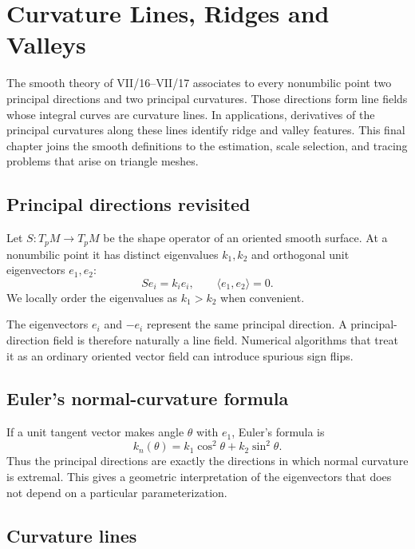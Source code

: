\chapter{Curvature Lines, Ridges and Valleys}
\label{ch:vii42}

The smooth theory of VII/16--VII/17 associates to every nonumbilic point two
principal directions and two principal curvatures.  Those directions form line
fields whose integral curves are curvature lines.  In applications, derivatives
of the principal curvatures along these lines identify ridge and valley
features.  This final chapter joins the smooth definitions to the estimation,
scale selection, and tracing problems that arise on triangle meshes.

\section{Principal directions revisited}

Let \(S:T_pM\to T_pM\) be the shape operator of an oriented smooth surface.  At
a nonumbilic point it has distinct eigenvalues \(k_1,k_2\) and orthogonal unit
eigenvectors \(e_1,e_2\):
\[
Se_i=k_i e_i,
\qquad
\langle e_1,e_2\rangle=0.
\]
We locally order the eigenvalues as \(k_1>k_2\) when convenient.

\begin{warning}\label{warn:vii42-linefield}
The eigenvectors \(e_i\) and \(-e_i\) represent the same principal direction.
A principal-direction field is therefore naturally a line field.  Numerical
algorithms that treat it as an ordinary oriented vector field can introduce
spurious sign flips.
\end{warning}

\section{Euler's normal-curvature formula}

If a unit tangent vector makes angle \(\theta\) with \(e_1\), Euler's formula is
\[
k_n(\theta)=k_1\cos^2\theta+k_2\sin^2\theta.
\]
Thus the principal directions are exactly the directions in which normal
curvature is extremal.  This gives a geometric interpretation of the eigenvectors
that does not depend on a particular parameterization.

\section{Curvature lines}

